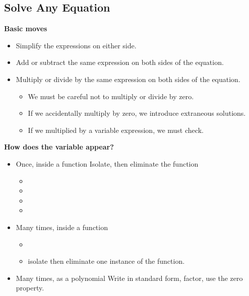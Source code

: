 \subsection{Solve Any Equation} 
 
\begin{fact}
\textbf{Basic moves}
\begin{itemize}
\item Simplify the expressions on either side.
\item Add or subtract the same expression on both sides of the equation.
\item Multiply or divide by the same expression on both sides of the equation.
\begin{itemize}
\item We must be careful not to multiply or divide by zero.
\item If we accidentally multiply by zero, we introduce extraneous solutions.
\item If we multiplied by a variable expression, we must check.
\end{itemize}
\end{itemize}
\textbf{How does the variable appear?}
\begin{itemize}
\item Once, inside a function {\textrightarrow} Isolate, then eliminate the function
\begin{itemize}
\item{}
\item{}
\item{}
\item{}
\end{itemize}
\item Many times, inside a function
\begin{itemize}
\item{}
\item{} isolate then eliminate one instance of the function.
\end{itemize}
\item Many times, as a polynomial {\textrightarrow} Write in standard form, factor, use the zero property.
\end{itemize}
\end{fact}